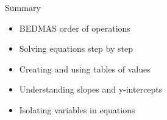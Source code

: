 \documentclass[aspectratio=169]{beamer}
\begin{document}
\begin{frame}{Summary}
    \begin{tcolorbox}[colback=lightgray,colframe=primary,title=Key Concepts]
        \begin{itemize}
            \item BEDMAS order of operations
            \item Solving equations step by step
            \item Creating and using tables of values
            \item Understanding slopes and y-intercepts
            \item Isolating variables in equations
        \end{itemize}
    \end{tcolorbox}
\end{frame}
\end{document}
